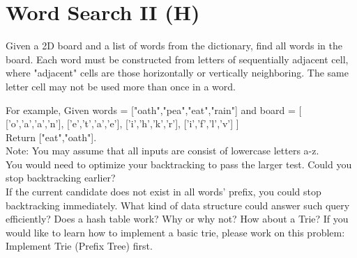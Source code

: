 \section{Word Search II (H)}
Given a 2D board and a list of words from the dictionary, find all words in the board. Each word must be constructed from letters of sequentially adjacent cell, where "adjacent" cells are those horizontally or vertically neighboring. The same letter cell may not be used more than once in a word.

For example,
Given words = ["oath","pea","eat","rain"] and board =
[
  ['o','a','a','n'],
  ['e','t','a','e'],
  ['i','h','k','r'],
  ['i','f','l','v']
]\\

Return ["eat","oath"].\\

Note:
You may assume that all inputs are consist of lowercase letters a-z.\\

You would need to optimize your backtracking to pass the larger test. Could you stop backtracking earlier?\\

If the current candidate does not exist in all words' prefix, you could stop backtracking immediately. What kind of data structure could answer such query efficiently? Does a hash table work? Why or why not? How about a Trie? If you would like to learn how to implement a basic trie, please work on this problem: Implement Trie (Prefix Tree) first.\\

